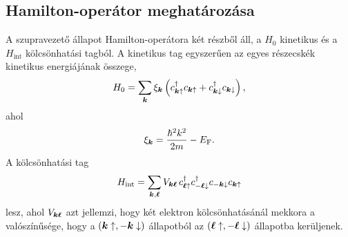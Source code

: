 \documentclass[a4paper,12pt,titlepage]{article}
\newcommand{\KK}{{\vb*{k}}}
\newcommand{\LL}{{\vb*{\ell}}}
\begin{document}
\subsection{Hamilton-operátor meghatározása}

A szupravezető állapot Hamilton-operátora két részből áll, a $H_0$ kinetikus és a $H_\text{int}$ kölcsönhatási tagból.  A kinetikus tag egyszerűen az egyes részecskék kinetikus energiájának összege,
\begin{equation}
	H_0 = \sum\limits_\KK \xi_\KK \left( c_{\KK \uparrow}^\dagger c_{\KK \uparrow} + c_{\KK \downarrow}^\dagger c_{\KK \downarrow} \right),
\end{equation}
ahol
$$ \xi_\KK = \frac{\hbar^2 k^2}{2 m} - E_\text{F}. $$
A kölcsönhatási tag
\begin{equation} \label{H-int-def}
	H_\text{int} = \sum\limits_{\KK, \LL} V_{\KK \LL} \, c_{\LL \uparrow}^\dagger c_{-\LL \downarrow}^\dagger c_{-\KK \downarrow} c_{\KK \uparrow}
\end{equation}
lesz, ahol $V_{\KK \LL}$ azt jellemzi, hogy két elektron kölcsönhatásánál mekkora a valószínűsége, hogy a $\left( \KK \uparrow, -\KK \downarrow \right)$ állapotból az $\left( \LL \uparrow, -\LL \downarrow \right)$ állapotba kerüljenek.
\end{document}
